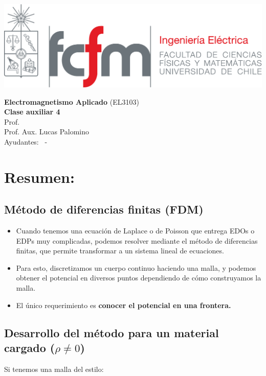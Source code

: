 \documentclass[
  11pt,
  letterpaper,
   answers
  ]{exam}
\begin{document}
\noindent
\begin{minipage}{0.47\textwidth}
  \includegraphics[width=\textwidth]{../fcfm_die}
\end{minipage}
\begin{minipage}{0.53\textwidth}
\begin{center} 
\large\textbf{Electromagnetismo Aplicado} (EL3103) \\
\large\textbf{Clase auxiliar 4} \\
\normalsize Prof.~\professor\\
\normalsize Prof. Aux. Lucas Palomino
\\
\normalsize Ayudantes: \ayudanteA~-~\ayudanteB
\end{center}
\end{minipage}

\vspace{0.5cm}
\noindent
\vspace{.85cm}
\section{Resumen:}
\subsection*{Método de diferencias finitas (FDM)}
\begin{itemize}
    \item Cuando tenemos una ecuación de Laplace o de Poisson que entrega EDOs o EDPs muy complicadas, podemos resolver mediante el método de diferencias finitas, que permite transformar a un sistema lineal de ecuaciones.
    \item Para esto, discretizamos un cuerpo continuo haciendo una malla, y podemos obtener el potencial en diversos puntos dependiendo de cómo construyamos la malla.
    \item El único requerimiento es \textbf{conocer el potencial en una frontera.}
\end{itemize}
\subsection*{Desarrollo del método para un material cargado ($\rho \neq 0$)}
Si tenemos una malla del estilo:
\end{document}
